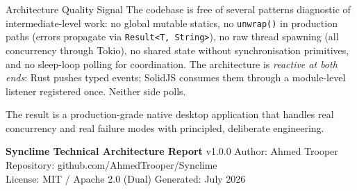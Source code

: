 \documentclass[10pt,letterpaper]{article}
\begin{document}
\begin{insightbox}{Architecture Quality Signal}
The codebase is free of several patterns diagnostic of intermediate-level work: no global
mutable statics, no \texttt{unwrap()} in production paths (errors propagate via
\texttt{Result<T, String>}), no raw thread spawning (all concurrency through Tokio), no
shared state without synchronisation primitives, and no sleep-loop polling for coordination.
The architecture is \emph{reactive at both ends}: Rust pushes typed events; SolidJS
consumes them through a module-level listener registered once. Neither side polls.

The result is a production-grade native desktop application that handles real concurrency
and real failure modes with principled, deliberate engineering.
\end{insightbox}

\vspace{1.5cm}
\noindent{\color{RuleGray}\rule{\linewidth}{0.4pt}}
\vspace{0.3cm}

\noindent\small\color{MidGray}
\textbf{Synclime Technical Architecture Report} \textemdash{} v1.0.0 \quad
Author: Ahmed Trooper \quad
Repository: github.com/AhmedTrooper/Synclime\\
License: MIT / Apache 2.0 (Dual) \quad
Generated: July 2026
\end{document}
